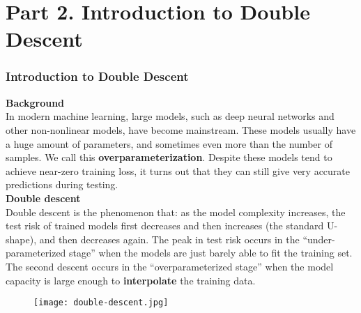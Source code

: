 \documentclass{beamer}
\begin{document}
	\section{Part 2. Introduction to Double Descent}
	\begin{frame}[t]
		\frametitle{Introduction to Double Descent}
		\scriptsize
		\textbf{\small Background}\\
		
		\vspace{1mm}
		In modern machine learning, large models, such as deep neural networks and other non-nonlinear models, have become mainstream. These models usually have a huge amount of parameters, and sometimes even more than the number of samples. We call this \textbf{overparameterization}. Despite these models tend to achieve near-zero training loss, it turns out that they can still give very accurate predictions during testing.\\
		
		\vspace{2mm}
		\textbf{\small Double descent}\\
		
		\vspace{1mm}
		Double descent is the phenomenon that: as the model complexity increases, the test risk of trained models first decreases and then increases (the standard U-shape), and then decreases again. The peak in test risk occurs in the “under-parameterized stage” when the models are just barely able to fit the training set. The second descent occurs in the “overparameterized stage” when the model capacity is large enough to \textbf{interpolate} the training data.
		\vspace{-3mm}
		\begin{figure}[H]
			\centering
			\texttt{[image: double-descent.jpg]}
			\vspace*{-5mm}
			\label{fig:3}
		\end{figure}
	\end{frame}
\end{document}
